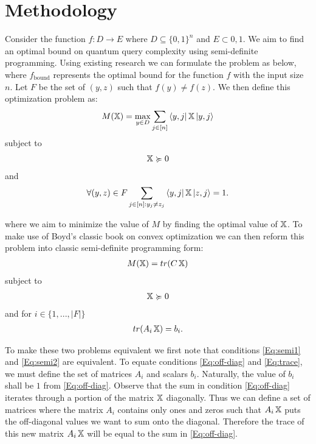 \section{Methodology}

Consider the function $f: D \rightarrow E$ where $D
\subseteq {\{0,1\}}^n$ and $E \subset {0,1}$. We aim to find an
optimal bound on quantum query complexity using semi-definite
programming. Using existing research
\cite{reichardt2009span} we can formulate the problem as below, where
$f_{\text{bound}}$ represents the optimal bound for the function
$f$ with the input size $n$.
Let $F$ be the set of $(y,z)$ such that $f(y) \neq f(z)$.
We then define this optimization problem as:
\begin{align}
    M(\operatorname{\mathbb{X}}) = \max_{y \in D} \sum_{j \in [n]}
    \bra{y,j}\operatorname{\mathbb{X}}\ket{y,j} \nonumber
\end{align}
subject to
\begin{align}\label{Eq:semi1}
    \operatorname{\mathbb{X}} \succcurlyeq 0
\end{align}
and
\begin{align}\label{Eq:off-diag}
    \forall (y,z) \in F \sum_{j \in [n]: y_j \ne z_j} 
    \bra{y,j} \operatorname{\mathbb{X}} \ket{z, j} = 1. 
\end{align}

where we aim to minimize the value of $M$ by finding the optimal value
of $\operatorname{\mathbb{X}}$. To make use of Boyd's classic book on convex 
optimization \cite{boyd2004convex} we can then reform this 
problem into classic semi-definite programming form:
\begin{align}
    M(\operatorname{\mathbb{X}}) = tr(C\operatorname{\mathbb{X}}) \nonumber
\end{align}
subject to
\begin{align}\label{Eq:semi2}
    \operatorname{\mathbb{X}} \succcurlyeq 0  
\end{align}
and for $i \in \{1,...,|F|\}$
\begin{align}\label{Eq:trace}
    tr(A_i \operatorname{\mathbb{X}}) = b_i. 
\end{align}


To make these two problems equivalent we first note that
conditions \cref{Eq:semi1} and \cref{Eq:semi2} are equivalent.
To equate conditions \cref{Eq:off-diag}
and \cref{Eq:trace}, we must define the set of matrices $A_i$ and
scalars $b_i$. Naturally, the value of $b_i$ shall be $1$
from \cref{Eq:off-diag}.
Observe that the sum in condition \cref{Eq:off-diag}
iterates through a portion of the matrix $\operatorname{\mathbb{X}}$ diagonally.
Thus we can define a set of matrices where the matrix 
$A_i$ contains only ones and zeros
such that $A_i \operatorname{\mathbb{X}}$ puts the off-diagonal values we want
to sum onto the diagonal.
Therefore the trace of this new matrix $A_i \operatorname{\mathbb{X}}$ 
will be equal to the sum in \cref{Eq:off-diag}.

